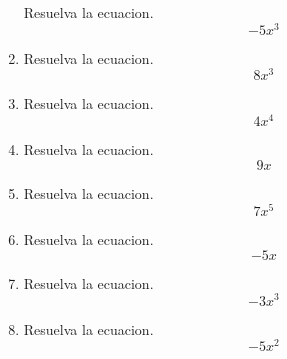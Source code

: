 \documentclass[12pt]{article}%
\begin{document}
\begin{enumerate}[wide, labelwidth=!, labelindent=0pt,label={Pregunta \arabic*. }]
%
Resuelva la ecuacion.%
\begin{equation*}- 5 x^{3}\end{equation*}%
\item%
%
Resuelva la ecuacion.%
\begin{equation*}8 x^{3}\end{equation*}%
\item%
%
Resuelva la ecuacion.%
\begin{equation*}4 x^{4}\end{equation*}%
\item%
%
Resuelva la ecuacion.%
\begin{equation*}9 x\end{equation*}%
\item%
%
Resuelva la ecuacion.%
\begin{equation*}7 x^{5}\end{equation*}%
\item%
%
Resuelva la ecuacion.%
\begin{equation*}- 5 x\end{equation*}%
\item%
%
Resuelva la ecuacion.%
\begin{equation*}- 3 x^{3}\end{equation*}%
\item%
%
Resuelva la ecuacion.%
\begin{equation*}- 5 x^{2}\end{equation*}%
\end{enumerate}%
\end{document}
